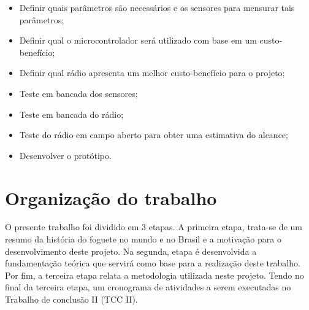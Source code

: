 \begin{itemize}
	\item Definir quais parâmetros são necessários e os sensores para mensurar tais parâmetros;
	
    \item Definir qual o microcontrolador será utilizado com base em um custo-benefício;
    
    \item Definir qual rádio apresenta um melhor custo-benefício para o projeto;
    
    \item Teste em bancada dos sensores;
    
    \item Teste em bancada do rádio;
    
    \item Teste do rádio em campo aberto para obter uma estimativa do alcance;
    
    \item Desenvolver o protótipo.
\end{itemize}





\section{Organização do trabalho}


O presente trabalho foi dividido em 3 etapas. A primeira etapa, trata-se de um resumo da história do foguete no mundo e no Brasil e a motivação para o desenvolvimento deste projeto. Na segunda, etapa é desenvolvida a fundamentação teórica que servirá como base para a realização deste trabalho. Por fim, a terceira etapa relata a metodologia utilizada neste projeto. Tendo no final da terceira etapa, um cronograma de atividades a serem executadas no Trabalho de conclusão II (TCC II).




